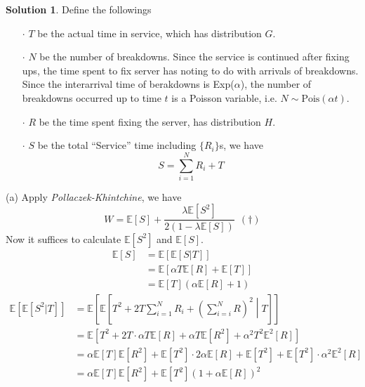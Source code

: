 \documentclass[a4paper, 10pt]{article}
\theoremstyle{definition}
\theoremstyle{hSol}
\newtheorem*{solution}{Solution}
\begin{document}
\begin{solution} Define the followings
\begin{itemize}
  \item[$\cdot$] $T$ be the actual time in service, which has distribution $G$. 
  \item[$\cdot$] $N$ be the number of breakdowns. Since the service is continued after fixing ups, the time spent to fix server has noting to do with arrivals of breakdowns. Since the interarrival time of berakdowns is Exp($\alpha$), the number of breakdowns occurred up to time $t$ is a Poisson variable, i.e. $N\sim\text{Pois}(\alpha t)$.
  \item[$\cdot$] $R$ be the time spent fixing the server, has distribution $H$.
  \item[$\cdot$] $S$ be the total ``Service'' time including $\{R_i\}$s, we have
  $$S = \sum_{i=1}^N R_i + T$$
\end{itemize}
(a) Apply \textit{Pollaczek-Khintchine}, we have
$$
  W = \mathbb{E}\left[S\right] + \frac{\lambda \mathbb{E}\left[S^2\right]}{2(1- \lambda \mathbb{E}\left[S\right])}~~(\dag)
$$
Now it suffices to calculate $\mathbb{E}\left[S^2\right]$ and $\mathbb{E}\left[S\right]$.
\begin{equation}
  \begin{split}
    \mathbb{E}\left[S\right] &= \mathbb{E}\left[\mathbb{E}\left[S|T\right] \right]  \\
    &= \mathbb{E}\left[\alpha T \mathbb{E}\left[R\right]+\mathbb{E}\left[T\right]\right]\\
    &= \mathbb{E}\left[T\right]\left(\alpha \mathbb{E}\left[R\right]+1\right)
  \end{split}
\end{equation}
\begin{equation}
  \begin{split}
    \mathbb{E}\left[\mathbb{E}\left[S^2|T\right]\right] &=
    \mathbb{E}\left[\mathbb{E}\left[T^2 + 2T\sum_{i=1}^N R_i + \left(\sum_{i=i}^N R\right)^2 \middle|T\right] \right]\\
    & = \mathbb{E}\left[T^2 + 2T\cdot \alpha T \mathbb{E}\left[R\right] + \alpha T \mathbb{E}\left[R^2\right]+\alpha^2 T^2 \mathbb{E}^2\left[R\right]\right] \\
    &= \alpha \mathbb{E}\left[T\right] \mathbb{E}\left[R^2\right] + \mathbb{E}\left[T^2\right]\cdot 2 \alpha \mathbb{E}\left[R\right] + \mathbb{E}\left[T^2\right] + \mathbb{E}\left[T^2\right]\cdot \alpha^2 \mathbb{E}^2\left[R\right]\\
    &= \alpha \mathbb{E}\left[T\right] \mathbb{E}\left[R^2\right] + \mathbb{E}\left[T^2\right]\left(1+\alpha \mathbb{E}\left[R\right]\right)^2

\end{split}
\end{equation}
\end{solution}
\end{document}
